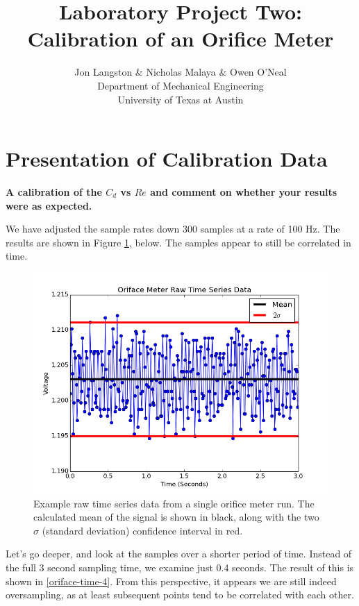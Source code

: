 \documentclass{article}
\title{\bf{Laboratory Project Two: Calibration of an Orifice Meter}}
\author{Jon Langston \& Nicholas Malaya \& Owen O'Neal \\ Department of Mechanical Engineering \\ University of Texas at Austin} \date{}
\begin{document}
\maketitle
\date{}
\newpage
\section{Presentation of Calibration Data}

\textbf{A calibration of the $C_d$ vs $Re$ and comment on whether your
results were as expected.}   

We have adjusted the sample rates down  300 samples at a rate of 100
Hz. The results are shown in Figure 
\ref{oriface-time}, below. The samples appear to still be correlated in
time. 

\begin{figure}[!htb]
  \begin{center}
    \includegraphics[width = 12 cm]{figs/oriface_time.png}
    \caption{Example raw time series data from a single orifice meter 
      run. The calculated mean of the signal is shown in black, along with
      the two $\sigma$ (standard deviation) confidence interval in
      red.}
    \label{oriface-time}
  \end{center}
\end{figure}

Let's go deeper, and look at the samples over a shorter period of time. Instead of the full 3 
second sampling time, we examine just 0.4 seconds. The result of this is shown in \ref{oriface-time-4}.
From this perspective, it appears we are still indeed oversampling, as at least subsequent points 
tend to be correlated with each other. 
\end{document}
